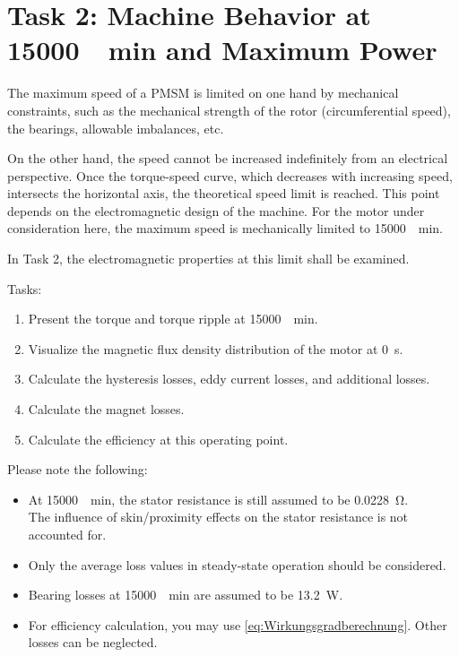 %
%

\chapter{Task 2: Machine Behavior at \SI{15000}{\per\minute} and Maximum Power}

The maximum speed of a \gls{PMSM} is limited on one hand by mechanical constraints, such as the mechanical strength of the rotor (circumferential speed), the bearings, allowable imbalances, etc.

On the other hand, the speed cannot be increased indefinitely from an electrical perspective. Once the torque-speed curve, which decreases with increasing speed, intersects the horizontal axis, the theoretical speed limit is reached. This point depends on the electromagnetic design of the machine. For the motor under consideration here, the maximum speed is mechanically limited to \SI{15000}{\per\minute}. 

In Task 2, the electromagnetic properties at this limit shall be examined.

\bigskip

Tasks:
\begin{enumerate}
	\item Present the torque and torque ripple at \SI{15000}{\per\minute}.
	\item Visualize the magnetic flux density distribution of the motor at \SI{0}{\second}.
	\item Calculate the hysteresis losses, eddy current losses, and additional losses.
	\item Calculate the magnet losses.
	\item Calculate the efficiency at this operating point.
\end{enumerate}

Please note the following:
\begin{itemize}
	\item At \SI{15000}{\per\minute}, the stator resistance is still assumed to be \SI{0.0228}{\ohm}.\\ 
	The influence of skin/proximity effects on the stator resistance is not accounted for.
	\item Only the average loss values in steady-state operation should be considered.
	\item Bearing losses at \SI{15000}{\per\minute} are assumed to be \SI{13.2}{\watt}.
	\item For efficiency calculation, you may use \autoref{eq:Wirkungsgradberechnung}. Other losses can be neglected.
\end{itemize}

